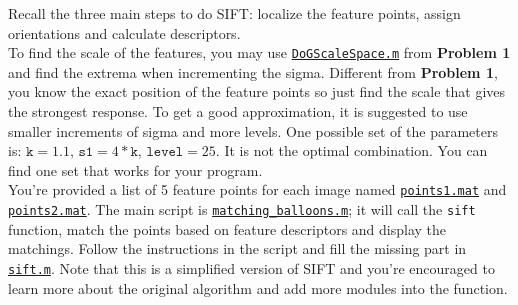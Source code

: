 Recall the three main steps to do SIFT: localize the feature points, assign orientations and calculate descriptors.\\
To find the scale of the features, you may use \href{./hw3/problem2/DoGScaleSpace.m}{\texttt{DoGScaleSpace.m}} from \textbf{Problem 1} and find the extrema when incrementing the sigma.
Different from \textbf{Problem 1}, you know the exact position of the feature points so just find the scale that gives the strongest response.
To get a good approximation, it is suggested to use smaller increments of sigma and more levels.
One possible set of the parameters is: \(\mathtt{k} = 1.1\), \(\mathtt{s1} = 4*\mathtt{k}\), \(\mathtt{level} = 25\).
It is not the optimal combination.
You can find one set that works for your program.\\
You're provided a list of 5 feature points for each image named \href{./hw3/problem2/points1.mat}{\texttt{points1.mat}} and \href{./hw3/problem2/points2.mat}{\texttt{points2.mat}}.
The main script is \href{./hw3/problem2/matching_balloons.m}{\texttt{matching\_balloons.m}}; it will call the \texttt{sift} function, match the points based on feature descriptors and display the matchings.
Follow the instructions in the script and fill the missing part in \href{./hw3/problem2/sift.m}{\texttt{sift.m}}.
Note that this is a simplified version of SIFT and you're encouraged to learn more about the original algorithm and add more modules into the function.



